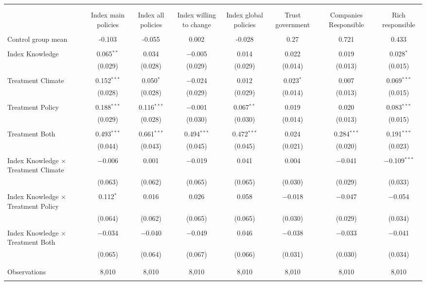 
\begin{tabular}{@{\extracolsep{5pt}}lccccccc} 
\\[-1.8ex]\hline 
\hline \\[-1.8ex] 
\\[-1.8ex] & Index main policies & Index all policies & Index willing to change & Index global policies & Trust government & Companies Responsible & Rich responsible \\ 
\hline \\[-1.8ex] 
 Control group mean & -0.103 & -0.055 & 0.002 & -0.028 & 0.27 & 0.721 & 0.433  \\ \hline \\[-1.8ex] Index Knowledge & 0.065$^{**}$ & 0.034 & $-$0.005 & 0.014 & 0.022 & 0.019 & 0.028$^{*}$ \\ 
  & (0.029) & (0.028) & (0.029) & (0.029) & (0.014) & (0.013) & (0.015) \\ 
  & & & & & & & \\ 
 Treatment Climate & 0.152$^{***}$ & 0.050$^{*}$ & $-$0.024 & 0.012 & 0.023$^{*}$ & 0.007 & 0.069$^{***}$ \\ 
  & (0.028) & (0.028) & (0.029) & (0.029) & (0.014) & (0.013) & (0.015) \\ 
  & & & & & & & \\ 
 Treatment Policy & 0.188$^{***}$ & 0.116$^{***}$ & $-$0.001 & 0.067$^{**}$ & 0.019 & 0.020 & 0.083$^{***}$ \\ 
  & (0.029) & (0.028) & (0.030) & (0.030) & (0.014) & (0.013) & (0.015) \\ 
  & & & & & & & \\ 
 Treatment Both & 0.493$^{***}$ & 0.661$^{***}$ & 0.494$^{***}$ & 0.472$^{***}$ & 0.024 & 0.284$^{***}$ & 0.191$^{***}$ \\ 
  & (0.044) & (0.043) & (0.045) & (0.045) & (0.021) & (0.020) & (0.023) \\ 
  & & & & & & & \\ 
 Index Knowledge $\times$ Treatment Climate & $-$0.006 & 0.001 & $-$0.019 & 0.041 & 0.004 & $-$0.041 & $-$0.109$^{***}$ \\ 
  & (0.063) & (0.062) & (0.065) & (0.065) & (0.030) & (0.029) & (0.033) \\ 
  & & & & & & & \\ 
 Index Knowledge $\times$ Treatment Policy & 0.112$^{*}$ & 0.016 & 0.026 & 0.058 & $-$0.018 & $-$0.047 & $-$0.054 \\ 
  & (0.064) & (0.062) & (0.065) & (0.065) & (0.030) & (0.029) & (0.034) \\ 
  & & & & & & & \\ 
 Index Knowledge $\times$ Treatment Both & $-$0.034 & $-$0.040 & $-$0.049 & 0.046 & $-$0.038 & $-$0.033 & $-$0.041 \\ 
  & (0.065) & (0.064) & (0.067) & (0.066) & (0.031) & (0.030) & (0.034) \\ 
  & & & & & & & \\ 
\hline \\[-1.8ex] 

Observations & 8,010 & 8,010 & 8,010 & 8,010 & 8,010 & 8,010 & 8,010 \\ 
\hline 
\hline \\[-1.8ex] 
\end{tabular} 